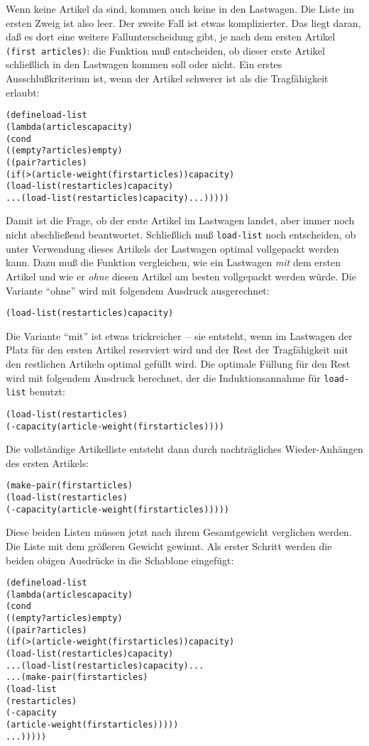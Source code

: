 %
Wenn keine Artikel da sind, kommen
auch keine in den Lastwagen.  Die Liste im ersten Zweig ist also leer.  Der
zweite Fall ist etwas komplizierter.
Das liegt daran, daß es dort
eine weitere Fallunterscheidung gibt, je nach dem ersten Artikel
\texttt{(first articles)}:
die Funktion muß entscheiden, ob dieser erste
Artikel schließlich in den Lastwagen kommen soll oder nicht.
Ein erstes Ausschlußkriterium ist, wenn der Artikel schwerer ist als die
Tragfähigkeit erlaubt:
%
\begin{alltt}
(define load-list
  (lambda (articles capacity)
    (cond
     ((empty? articles) empty)
     ((pair? articles)
        (if (> (article-weight (first articles)) capacity)
            (load-list (rest articles) capacity)
            ... (load-list (rest articles) capacity) ...)))))
\end{alltt}
%
Damit ist die Frage, ob der erste Artikel im Lastwagen landet, aber immer
noch nicht abschließend beantwortet.  Schließlich muß
\texttt{load-list} noch entscheiden, ob unter Verwendung dieses
Artikels der Lastwagen optimal vollgepackt werden
kann.  Dazu muß die Funktion vergleichen, wie ein Lastwagen \emph{mit}
dem ersten Artikel und wie er \emph{ohne} diesen Artikel am besten
vollgepackt werden würde.   Die Variante "`ohne"' wird mit folgendem
Ausdruck ausgerechnet:
%
\begin{alltt}
  (load-list (rest articles) capacity)
\end{alltt}
%
Die Variante "`mit"' ist etwas trickreicher~-- sie entsteht, wenn im
Lastwagen der Platz für den ersten Artikel reserviert wird und
der Rest der Tragfähigkeit mit den restlichen Artikeln optimal gefüllt wird.
Die optimale Füllung für den Rest wird mit folgendem Ausdruck
berechnet, der die Induktionsannahme für \texttt{load-list} benutzt:
%
\begin{alltt}
  (load-list (rest articles) 
                 (- capacity (article-weight (first articles))))
\end{alltt}
%
Die vollständige Artikelliste entsteht dann durch nachträgliches
Wieder-Anhängen des ersten Artikels:
%
\begin{alltt}
  (make-pair (first articles)
             (load-list (rest articles)
                            (- capacity (article-weight (first articles)))))
\end{alltt}
%
Diese beiden Listen müssen jetzt nach ihrem Gesamtgewicht verglichen
werden.  Die Liste mit dem größeren Gewicht gewinnt.  Als erster
Schritt werden die beiden obigen Ausdrücke in die Schablone eingefügt:
%
\begin{alltt}
(define load-list
  (lambda (articles capacity)
    (cond
     ((empty? articles) empty)
     ((pair? articles)
        (if (> (article-weight (first articles)) capacity)
            (load-list (rest articles) capacity)
            ... (load-list (rest articles) capacity) ...
            ... (make-pair (first articles)
                           (load-list
                             (rest articles)
                             (- capacity
                                (article-weight (first articles)))))
            ...)))))
\end{alltt}
